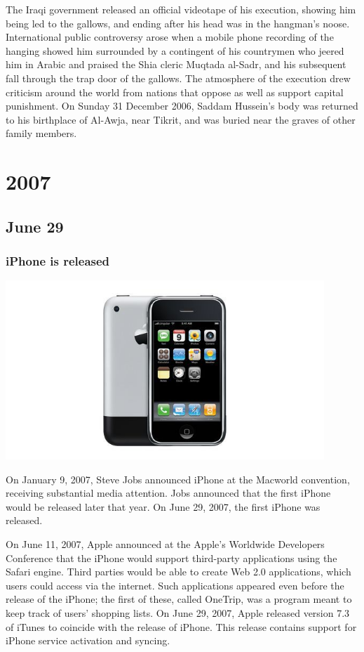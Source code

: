 \documentclass[11pt]{report}
\begin{document}
The Iraqi government released an official videotape of his execution, showing him being led to the gallows, and ending after his head was in the hangman's noose. International public controversy arose when a mobile phone recording of the hanging showed him surrounded by a contingent of his countrymen who jeered him in Arabic and praised the Shia cleric Muqtada al-Sadr, and his subsequent fall through the trap door of the gallows. The atmosphere of the execution drew criticism around the world from nations that oppose as well as support capital punishment. On Sunday 31 December 2006, Saddam Hussein's body was returned to his birthplace of Al-Awja, near Tikrit, and was buried near the graves of other family members.

\chapter{2007}
\section{June 29}
\subsection{iPhone is released}
\vspace{2mm}\begin{center}\includegraphics[width=12cm]{./img/iphone1.jpg}\end{center}
On January 9, 2007, Steve Jobs announced iPhone at the Macworld convention, receiving substantial media attention. Jobs announced that the first iPhone would be released later that year. On June 29, 2007, the first iPhone was released.

On June 11, 2007, Apple announced at the Apple's Worldwide Developers Conference that the iPhone would support third-party applications using the Safari engine. Third parties would be able to create Web 2.0 applications, which users could access via the internet. Such applications appeared even before the release of the iPhone; the first of these, called OneTrip, was a program meant to keep track of users' shopping lists. On June 29, 2007, Apple released version 7.3 of iTunes to coincide with the release of iPhone. This release contains support for iPhone service activation and syncing.
\end{document}
